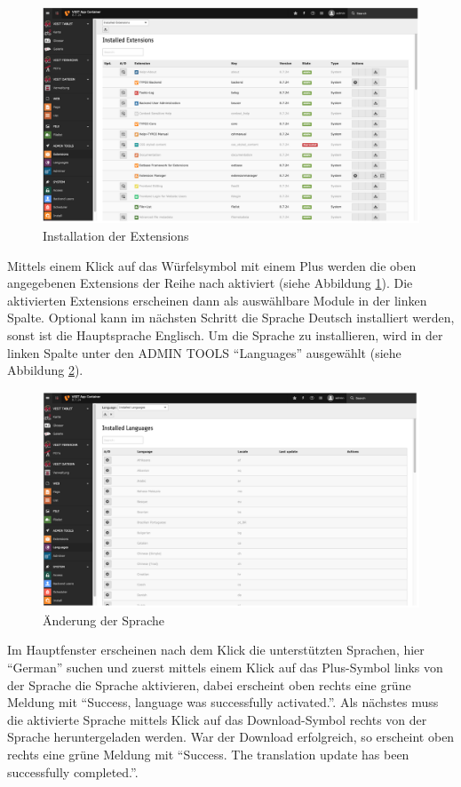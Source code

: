\begin{figure}[ht!]
\centering
\includegraphics[width=12cm]{Figures/paula/typo3/extensions.png}
\caption{Installation der Extensions}
\label{img:extensions}
\end{figure}

Mittels einem Klick auf das Würfelsymbol mit einem Plus werden die oben angegebenen Extensions der Reihe nach aktiviert (siehe Abbildung \ref{img:extensions}). Die aktivierten Extensions erscheinen dann als auswählbare Module in der linken Spalte.
Optional kann im nächsten Schritt die Sprache Deutsch installiert werden, sonst ist die Hauptsprache Englisch. Um die Sprache zu installieren, wird in der linken Spalte unter den ADMIN TOOLS “Languages” ausgewählt (siehe Abbildung \ref{img:sprache_aendern}).

\begin{figure}[ht!]
\centering
\includegraphics[width=12cm]{Figures/paula/typo3/sprache_aendern.png}
\caption{Änderung der Sprache}
\label{img:sprache_aendern}
\end{figure}

Im Hauptfenster erscheinen nach dem Klick die unterstützten Sprachen, hier “German” suchen und zuerst mittels einem Klick auf das Plus-Symbol links von der Sprache die Sprache aktivieren, dabei erscheint oben rechts eine grüne Meldung mit “Success, language was successfully activated.”. Als nächstes muss die aktivierte Sprache mittels Klick auf das Download-Symbol rechts von der Sprache heruntergeladen werden. War der Download erfolgreich, so erscheint oben rechts eine grüne Meldung mit “Success. The translation update has been successfully completed.”.

